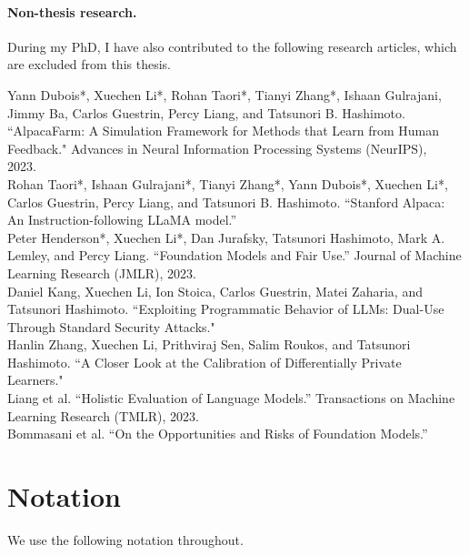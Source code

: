 \newpage
\paragraph{Non-thesis research.}
During my PhD, I have also contributed to the following research articles, which are excluded from this thesis.


\begin{verticalline}
Yann Dubois*, Xuechen Li*, Rohan Taori*, Tianyi Zhang*, Ishaan Gulrajani, Jimmy Ba, Carlos Guestrin, Percy Liang, and Tatsunori B. Hashimoto. ``AlpacaFarm: A Simulation Framework for Methods that Learn from Human Feedback."
Advances in Neural Information Processing Systems (NeurIPS), 2023.~\cite{dubois2023alpacafarm}\\

\noindent
Rohan Taori*, Ishaan Gulrajani*, Tianyi Zhang*, Yann Dubois*, Xuechen Li*, Carlos Guestrin, Percy Liang, and Tatsunori B. Hashimoto.
``Stanford Alpaca: An Instruction-following LLaMA model.''~\cite{alpaca}\\

\noindent 
Peter Henderson*, Xuechen Li*, Dan Jurafsky, Tatsunori Hashimoto, Mark A. Lemley, and Percy Liang. 
``Foundation Models and Fair Use.''
Journal of Machine Learning Research (JMLR), 2023.~\cite{henderson2023fairuse}\\

\noindent 
Daniel Kang, Xuechen Li, Ion Stoica, Carlos Guestrin, Matei Zaharia, and Tatsunori Hashimoto. ``Exploiting Programmatic Behavior of LLMs: Dual-Use Through Standard Security Attacks."~\cite{kang2023exploiting}\\

\noindent 
Hanlin Zhang, Xuechen Li, Prithviraj Sen, Salim Roukos, and Tatsunori Hashimoto. 
``A Closer Look at the Calibration of Differentially Private Learners."~\cite{zhang2022closer}\\

\noindent 
Liang et al.
``Holistic Evaluation of Language Models.''
Transactions on Machine Learning Research (TMLR), 2023.~\cite{liang2023holistic}\\


\noindent 
Bommasani et al.
``On the Opportunities and Risks of Foundation Models.''~\cite{bommasani2021opportunities}

\end{verticalline}

\newpage
\section{Notation}
We use the following notation throughout.

